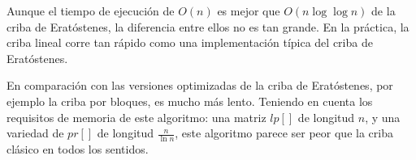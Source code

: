 Aunque el tiempo de ejecución de $O(n)$ es mejor que $O(n \log \log n)$ de la criba de Eratóstenes, la diferencia entre ellos no es tan grande. En la práctica, la criba lineal corre tan rápido como una implementación típica del criba de Eratóstenes.

En comparación con las versiones optimizadas de la criba de Eratóstenes, por ejemplo la criba por 
bloques, es mucho más lento. Teniendo en cuenta los requisitos de memoria de este algoritmo: una 
matriz $lp[]$ de longitud $n$, y una variedad de $pr[]$ de longitud $\frac n {\ln n}$, este algoritmo 
parece ser peor que la criba clásico en todos los sentidos.

